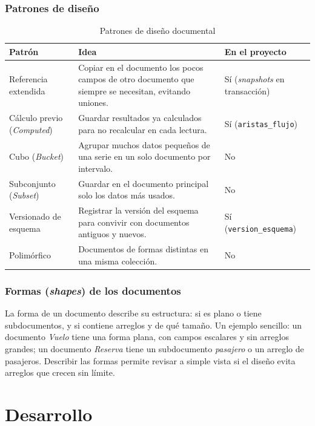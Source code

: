 \documentclass[11pt,a4paper]{article}
\begin{document}
	\subsubsection{Patrones de diseño}
	\begin{table}[H]
		\centering
		\caption{Patrones de diseño documental}
		\small
		\begin{tabularx}{\textwidth}{>{\raggedright\arraybackslash}p{3.3cm}Y>{\raggedright\arraybackslash}p{3cm}}
			\toprule
			\textbf{Patrón} & \textbf{Idea} & \textbf{En el proyecto} \\
			\midrule
			Referencia extendida & Copiar en el documento los pocos campos de otro documento que siempre se necesitan, evitando uniones. & Sí (\textit{snapshots} en transacción) \\
			Cálculo previo (\textit{Computed}) & Guardar resultados ya calculados para no recalcular en cada lectura. & Sí (\texttt{aristas\_flujo}) \\
			Cubo (\textit{Bucket}) & Agrupar muchos datos pequeños de una serie en un solo documento por intervalo. & No \\
			Subconjunto (\textit{Subset}) & Guardar en el documento principal solo los datos más usados. & No \\
			Versionado de esquema & Registrar la versión del esquema para convivir con documentos antiguos y nuevos. & Sí (\texttt{version\_esquema}) \\
			Polimórfico & Documentos de formas distintas en una misma colección. & No \\
			\bottomrule
		\end{tabularx}
	\end{table}
	
	\subsubsection{Formas (\textit{shapes}) de los documentos}
	La forma de un documento describe su estructura: si es plano o tiene subdocumentos, y si contiene arreglos y de qué tamaño. Un ejemplo sencillo: un documento \textit{Vuelo} tiene una forma plana, con campos escalares y sin arreglos grandes; un documento \textit{Reserva} tiene un subdocumento \textit{pasajero} o un arreglo de pasajeros. Describir las formas permite revisar a simple vista si el diseño evita arreglos que crecen sin límite.
	
	\section{Desarrollo}
	
\end{document}
